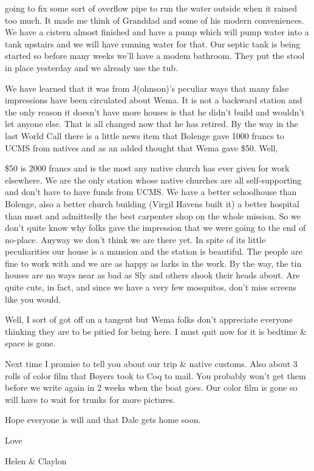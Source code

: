 \documentclass[
]{book}
\begin{document}
going to fix some sort of overflow pipe to run the water outside when it rained too much. It made me think of Granddad and some of his modern conveniences. We have a cistern almost finished and have a pump which will pump water into a tank upstairs and we will have running water for that. Our septic tank is being started so before many weeks we'll have a modem bathroom. They put the stool in place yesterday and we already use the tub.

We have learned that it was from J(ohnson)'s peculiar ways that many false impressions have been circulated about Wema. It is not a backward station and the only reason it doesn't have more houses is that he didn't build and wouldn't let anyone else. That is all changed now that he has retired. By the way in the last World Call there is a little news item that Bolenge gave 1000 francs to UCMS from natives and as an added thought that Wema gave \$50. Well,

\$50 is 2000 francs and is the most any native church has ever given for work elsewhere. We are the only station whose native churches are all self-supporting and don't have to have funds from UCMS. We have a better schoolhouse than Bolenge, also a better church building (Virgil Havens built it) a better hospital than most and admittedly the best carpenter shop on the whole mission. So we don't quite know why folks gave the impression that we were going to the end of no-place. Anyway we don't think we are there yet. In spite of its little peculiarities our house is a mansion and the station is beautiful. The people are fine to work with and we are as happy as larks in the work. By the way, the tin houses are no ways near as bad as Sly and others shook their heads about. Are quite cute, in fact, and since we have a very few mosquitos, don't miss screens like you would.

Well, I sort of got off on a tangent but Wema folks don't appreciate everyone thinking they are to be pitied for being here. I must quit now for it is bedtime \& space is gone.

Next time I promise to tell you about our trip \& native customs. Also about 3 rolls of color film that Boyers took to Coq to mail. You probably won't get them before we write again in 2 weeks when the boat goes. Our color film is gone so will have to wait for trunks for more pictures.

Hope everyone is will and that Dale gets home soon.

Love

Helen \& Claylon
\end{document}
